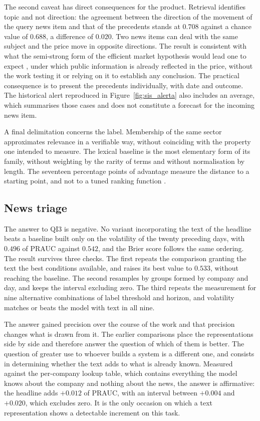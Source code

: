 The second caveat has direct consequences for the product. Retrieval identifies topic and not
direction: the agreement between the direction of the movement of the query news item and that of
the precedents stands at $0.708$ against a chance value of $0.688$, a difference of $0.020$. Two
news items can deal with the same subject and the price move in opposite directions. The result is
consistent with what the semi-strong form of the efficient market hypothesis would lead one to
expect \autocite{fama1970efficient}, under which public information is already reflected in the
price, without the work testing it or relying on it to establish any conclusion. The practical
consequence is to present the precedents individually, with date and outcome. The historical alert
reproduced in Figure~\ref{fig:sis_alerta} also includes an average, which summarises those cases
and does not constitute a forecast for the incoming news item.

A final delimitation concerns the label. Membership of the same sector approximates relevance in a
verifiable way, without coinciding with the property one intended to measure. The lexical baseline is
the most elementary form of its family, without weighting by the rarity of terms and without
normalisation by length. The seventeen percentage points of advantage measure the distance to a
starting point, and not to a tuned ranking function \autocite{robertson2009bm25}.

\subsection{News triage}

The answer to \gls{QI}3 is negative. No variant incorporating the text of the headline beats a
baseline built only on the volatility of the twenty preceding days, with $0.496$ of \gls{PRAUC}
against $0.542$, and the Brier score follows the same ordering. The result survives three checks.
The first repeats the comparison granting the text the best conditions available, and raises its
best value to $0.533$, without reaching the baseline. The second resamples by groups formed by
company and day, and keeps the interval excluding zero. The third repeats the measurement for nine
alternative combinations of label threshold and horizon, and volatility matches or beats the model
with text in all nine.

The answer gained precision over the course of the work and that precision changes what is drawn
from it. The earlier comparisons place the representations side by side and therefore answer the
question of which of them is better. The question of greater use to whoever builds a system is a
different one, and consists in determining whether the text adds to what is already known. Measured
against the per-company lookup table, which contains everything the model knows about the company
and nothing about the news, the answer is affirmative: the headline adds $+0.012$ of \gls{PRAUC},
with an interval between $+0.004$ and $+0.020$, which excludes zero. It is the only occasion on
which a text representation shows a detectable increment on this task.

